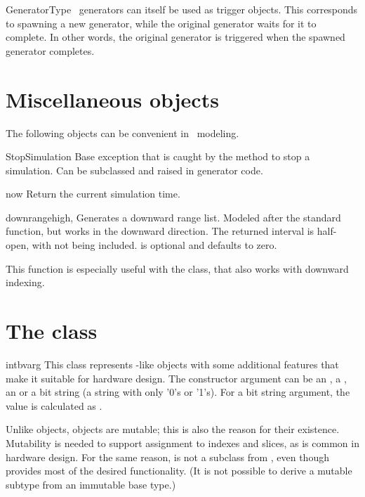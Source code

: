 \begin{datadesc}{GeneratorType}
\myhdl\ generators can itself be used as trigger objects. 
This corresponds to spawning a new generator, while the original
generator waits for it to complete.  In other words, the original
generator is triggered when the spawned generator completes.
\end{datadesc}


\section{Miscellaneous objects}

The following objects can be convenient in \myhdl\ modeling.

\begin{excclassdesc}{StopSimulation}{}
Base exception that is caught by the  method to
stop a simulation. Can be subclassed and raised in generator code.
\end{excclassdesc}

\begin{funcdesc}{now}{}
Return the current simulation time.
\end{funcdesc}

\begin{funcdesc}{downrange}{high, }
Generates a downward range list. Modeled after the standard
 function, but works in the downward direction. The
returned interval is half-open, with  not being
included.  is optional and defaults to zero.

This function is especially useful with the  class, that
also works with downward indexing.
\end{funcdesc}

\section{The  class}

\begin{classdesc}{intbv}{arg}
This class represents -like objects with some additional
features that make it suitable for hardware design. The constructor
argument can be an , a , an  or a
bit string (a string with only '0's or '1's). For a bit string
argument, the value is calculated as . 
\end{classdesc}

Unlike  objects,  objects are mutable; this is
also the reason for their existence. Mutability is needed to support
assignment to indexes and slices, as is common in hardware design. For
the same reason,  is not a subclass from ,
even though  provides most of the desired
functionality. (It is not possible to derive a mutable subtype from
an immutable base type.)

